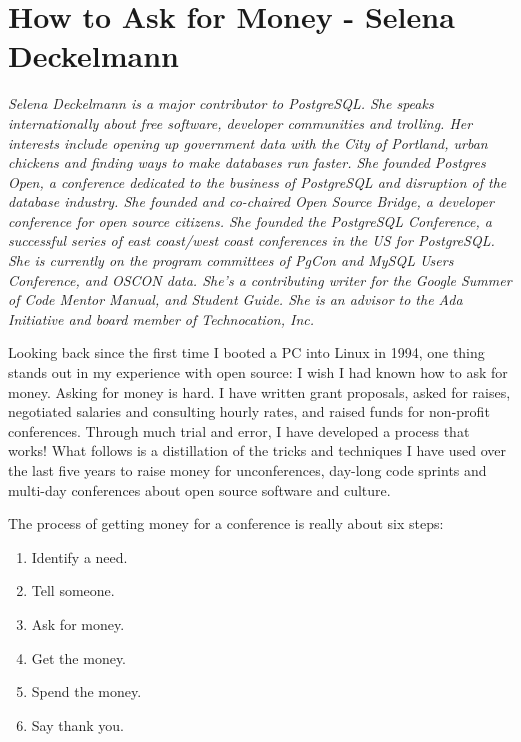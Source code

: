\chapter{How to Ask for Money - Selena Deckelmann}

\textit{Selena Deckelmann is a major contributor to PostgreSQL. She speaks
internationally about free software, developer communities and trolling. Her
interests include opening up government data with the City of Portland, urban
chickens and finding ways to make databases run faster.
\newline
She founded Postgres Open, a conference
dedicated to the business of PostgreSQL and disruption of the database industry.
She founded and co-chaired Open Source Bridge, a developer conference
for open source citizens. She founded the PostgreSQL Conference, a successful
series of east coast/west coast conferences in the US for PostgreSQL. She is
currently on the program committees of PgCon and MySQL Users Conference, and
OSCON data. She's a contributing writer for the Google Summer of Code Mentor
Manual, and Student Guide. She is an advisor to the Ada Initiative and board
member of Technocation, Inc.}


Looking back since the first time I booted a PC into Linux in 1994, one thing
stands out in my experience with open source: I wish I had known how to
ask for money.
Asking for money is hard. I have written grant proposals, asked for raises,
negotiated salaries and consulting hourly rates, and raised funds for non-profit
conferences. Through much trial and error, I have developed a process that
works!
What follows is a distillation of the tricks and techniques I have used over the
last five years to raise money for unconferences, day-long code sprints and
multi-day conferences about open source software and culture.

The process of getting money for a conference is really about six steps: 
\begin{enumerate}
 \item Identify a need. 
 \item Tell someone. 
 \item Ask for money.
 \item Get the money.
 \item Spend the money. 
 \item Say thank you.
\end{enumerate}

